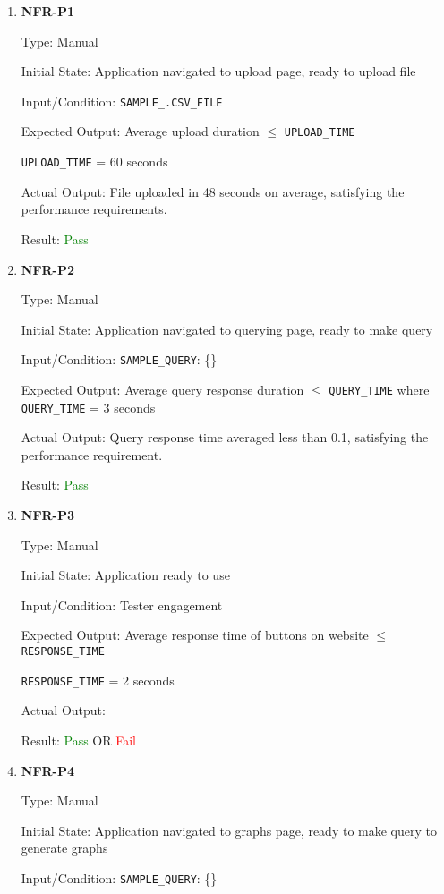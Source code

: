 \documentclass[12pt, titlepage]{article}
\begin{document}
\begin{enumerate}
  \item{\textbf{NFR-P1}} \label{NFR:P1}

Type: Manual

Initial State: Application navigated to upload page, ready to upload file

Input/Condition: \texttt{SAMPLE\_.CSV\_FILE}

Expected Output: Average upload duration $\leq$ \texttt{UPLOAD\_TIME}

\texttt{UPLOAD\_TIME} = 60 seconds

Actual Output: File uploaded in 48 seconds on average, satisfying the
performance requirements.

Result: \textcolor{green}{Pass}

  \item{\textbf{NFR-P2}} \label{NFR:P2}

Type: Manual

Initial State: Application navigated to querying page, ready to make query

Input/Condition: \texttt{SAMPLE\_QUERY}: \{\}

Expected Output: Average query response duration $\leq$ \texttt{QUERY\_TIME}
where \texttt{QUERY\_TIME} = 3 seconds

Actual Output: Query response time averaged less than 0.1, satisfying the
performance requirement.

Result: \textcolor{green}{Pass}

\item{\textbf{NFR-P3}} \label{NFR:P3}

Type: Manual

Initial State: Application ready to use

Input/Condition: Tester engagement

Expected Output: Average response time of buttons on website $\leq$
\texttt{RESPONSE\_TIME}

\texttt{RESPONSE\_TIME} = 2 seconds

Actual Output:

Result: \textcolor{green}{Pass} OR \textcolor{red}{Fail}

\item{\textbf{NFR-P4}} \label{NFR:P4}

Type: Manual

Initial State: Application navigated to graphs page, ready to make query to
generate graphs

Input/Condition: \texttt{SAMPLE\_QUERY}: \{\}
  

\end{enumerate}
\end{document}
